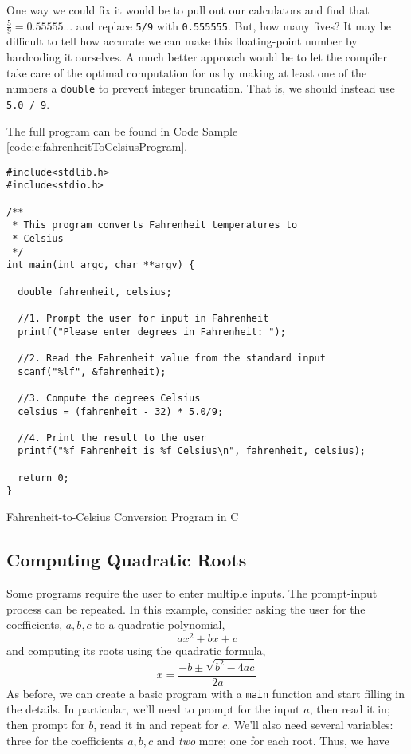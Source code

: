 One way we could fix it would be to pull out our calculators and find that
$\frac{5}{9} = 0.55555\ldots$ and replace \texttt{5/9} with \texttt{0.555555}.
But, how many fives?  It may be difficult to tell how accurate we can make
this floating-point number by hardcoding it ourselves.  A much better approach
would be to let the compiler take care of the optimal computation for us by
making at least one of the numbers a \texttt{double} to prevent
integer truncation.  That is, we should instead use \texttt{5.0 / 9}.

The full program can be found in Code Sample \ref{code:c:fahrenheitToCelsiusProgram}.

\begin{listing}[H]
\begin{verbatim}
#include<stdlib.h>
#include<stdio.h>

/**
 * This program converts Fahrenheit temperatures to 
 * Celsius
 */
int main(int argc, char **argv) {

  double fahrenheit, celsius;
  
  //1. Prompt the user for input in Fahrenheit
  printf("Please enter degrees in Fahrenheit: ");
  
  //2. Read the Fahrenheit value from the standard input
  scanf("%lf", &fahrenheit);
  
  //3. Compute the degrees Celsius
  celsius = (fahrenheit - 32) * 5.0/9;
  
  //4. Print the result to the user
  printf("%f Fahrenheit is %f Celsius\n", fahrenheit, celsius);
  
  return 0;
}
\end{verbatim}
\caption{Fahrenheit-to-Celsius Conversion Program in C}
\label{code:c:fahrenheitToCelsiusProgram}
\end{listing}

\subsection{Computing Quadratic Roots}

Some programs require the user to enter multiple inputs.  The 
prompt-input process can be repeated.  In this example, consider asking
the user for the coefficients, $a, b, c$ to a quadratic polynomial, 
  $$ax^2 + bx + c$$
and computing its roots using the quadratic formula, 
  $$x = \frac{-b \pm \sqrt{b^2 - 4ac}}{2a}$$
As before, we can create a basic program with a \texttt{main}
function and start filling in the details.  In particular, we'll need to prompt
for the input $a$, then read it in; then prompt for $b$, read it in and
repeat for $c$.  We'll also need several variables: three for the coefficients
$a, b, c$ and \emph{two} more; one for each root.  Thus, we have 

